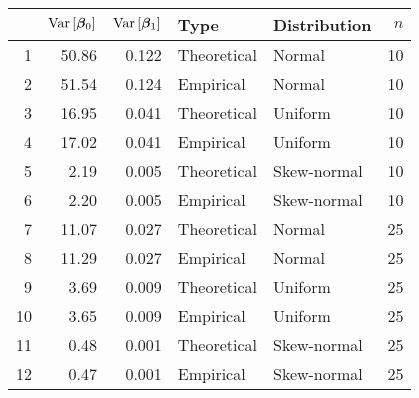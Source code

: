 \begin{table}[ht]
\centering
\begin{tabular}{rrrllr}
  \hline
 & $\text{Var}\left[\boldsymbol{\beta}_0\right]$ & $\text{Var}\left[\boldsymbol{\beta}_1\right]$ & Type & Distribution & $n$ \\ 
  \hline
1 & 50.86 & 0.122 & Theoretical & Normal & 10 \\ 
  2 & 51.54 & 0.124 & Empirical & Normal & 10 \\ 
  3 & 16.95 & 0.041 & Theoretical & Uniform & 10 \\ 
  4 & 17.02 & 0.041 & Empirical & Uniform & 10 \\ 
  5 & 2.19 & 0.005 & Theoretical & Skew-normal & 10 \\ 
  6 & 2.20 & 0.005 & Empirical & Skew-normal & 10 \\ 
  7 & 11.07 & 0.027 & Theoretical & Normal & 25 \\ 
  8 & 11.29 & 0.027 & Empirical & Normal & 25 \\ 
  9 & 3.69 & 0.009 & Theoretical & Uniform & 25 \\ 
  10 & 3.65 & 0.009 & Empirical & Uniform & 25 \\ 
  11 & 0.48 & 0.001 & Theoretical & Skew-normal & 25 \\ 
  12 & 0.47 & 0.001 & Empirical & Skew-normal & 25 \\ 
   \hline
\end{tabular}
\end{table}
